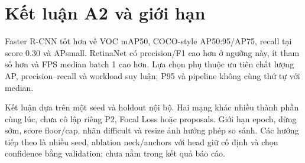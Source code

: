 \section{Kết luận A2 và giới hạn}
Faster R-CNN tốt hơn về VOC mAP50, COCO-style AP50:95/AP75, recall tại score
0.30 và APsmall. RetinaNet có precision/F1 cao hơn ở ngưỡng này, ít tham số
hơn và FPS median batch 1 cao hơn. Lựa chọn phụ thuộc ưu tiên chất lượng AP,
precision--recall và workload suy luận; P95 và pipeline không cùng thứ tự với median.

Kết luận dựa trên một seed và holdout nội bộ. Hai mạng khác nhiều thành phần
cùng lúc, chưa cô lập riêng P2, Focal Loss hoặc proposals. Giới hạn epoch,
dừng sớm, score floor/cap, nhãn difficult và resize ảnh hưởng phép so sánh.
Các hướng tiếp theo là nhiều seed, ablation neck/anchors với head giữ cố định
và chọn confidence bằng validation; chưa nằm trong kết quả báo cáo.

